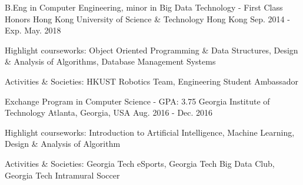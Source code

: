 

\begin{cventries}

  \cventry
    {B.Eng in Computer Engineering, minor in Big Data Technology - First Class Honors} %
    {Hong Kong University of Science \& Technology} %
    {Hong Kong} %
    {Sep. 2014 - Exp. May. 2018} %
    {
      \begin{cvitems} %
        \item Highlight courseworks: Object Oriented Programming \& Data Structures, Design \& Analysis of Algorithms, Database Management Systems
        \item Activities \& Societies: HKUST Robotics Team, Engineering Student Ambassador
      \end{cvitems}
    }
   \cventry
    {Exchange Program in Computer Science - GPA: 3.75} %
    {Georgia Institute of Technology} %
    {Atlanta, Georgia, USA} %
    {Aug. 2016 - Dec. 2016} %
    {
      \begin{cvitems} %
        \item Highlight courseworks: Introduction to Artificial Intelligence, Machine Learning, Design \& Analysis of Algorithm
        \item Activities \& Societies: Georgia Tech eSports, Georgia Tech Big Data Club, Georgia Tech Intramural Soccer
      \end{cvitems}
    }

\end{cventries}

